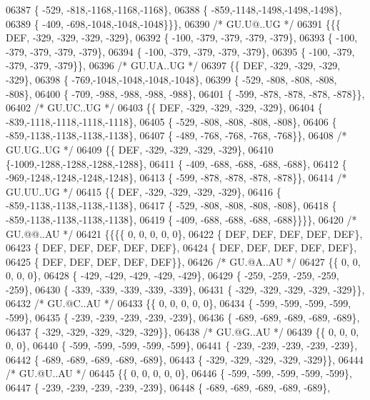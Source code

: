 \begin{DoxyCode}
06387 \{ -529, -818,-1168,-1168,-1168\},
06388 \{ -859,-1148,-1498,-1498,-1498\},
06389 \{ -409, -698,-1048,-1048,-1048\}\}\},
06390 \textcolor{comment}{/* GU.U@..UG */}
06391 \{\{\{  DEF, -329, -329, -329, -329\},
06392 \{ -100, -379, -379, -379, -379\},
06393 \{ -100, -379, -379, -379, -379\},
06394 \{ -100, -379, -379, -379, -379\},
06395 \{ -100, -379, -379, -379, -379\}\},
06396 \textcolor{comment}{/* GU.UA..UG */}
06397 \{\{  DEF, -329, -329, -329, -329\},
06398 \{ -769,-1048,-1048,-1048,-1048\},
06399 \{ -529, -808, -808, -808, -808\},
06400 \{ -709, -988, -988, -988, -988\},
06401 \{ -599, -878, -878, -878, -878\}\},
06402 \textcolor{comment}{/* GU.UC..UG */}
06403 \{\{  DEF, -329, -329, -329, -329\},
06404 \{ -839,-1118,-1118,-1118,-1118\},
06405 \{ -529, -808, -808, -808, -808\},
06406 \{ -859,-1138,-1138,-1138,-1138\},
06407 \{ -489, -768, -768, -768, -768\}\},
06408 \textcolor{comment}{/* GU.UG..UG */}
06409 \{\{  DEF, -329, -329, -329, -329\},
06410 \{-1009,-1288,-1288,-1288,-1288\},
06411 \{ -409, -688, -688, -688, -688\},
06412 \{ -969,-1248,-1248,-1248,-1248\},
06413 \{ -599, -878, -878, -878, -878\}\},
06414 \textcolor{comment}{/* GU.UU..UG */}
06415 \{\{  DEF, -329, -329, -329, -329\},
06416 \{ -859,-1138,-1138,-1138,-1138\},
06417 \{ -529, -808, -808, -808, -808\},
06418 \{ -859,-1138,-1138,-1138,-1138\},
06419 \{ -409, -688, -688, -688, -688\}\}\}\},
06420 \textcolor{comment}{/* GU.@@..AU */}
06421 \{\{\{\{    0,    0,    0,    0,    0\},
06422 \{  DEF,  DEF,  DEF,  DEF,  DEF\},
06423 \{  DEF,  DEF,  DEF,  DEF,  DEF\},
06424 \{  DEF,  DEF,  DEF,  DEF,  DEF\},
06425 \{  DEF,  DEF,  DEF,  DEF,  DEF\}\},
06426 \textcolor{comment}{/* GU.@A..AU */}
06427 \{\{    0,    0,    0,    0,    0\},
06428 \{ -429, -429, -429, -429, -429\},
06429 \{ -259, -259, -259, -259, -259\},
06430 \{ -339, -339, -339, -339, -339\},
06431 \{ -329, -329, -329, -329, -329\}\},
06432 \textcolor{comment}{/* GU.@C..AU */}
06433 \{\{    0,    0,    0,    0,    0\},
06434 \{ -599, -599, -599, -599, -599\},
06435 \{ -239, -239, -239, -239, -239\},
06436 \{ -689, -689, -689, -689, -689\},
06437 \{ -329, -329, -329, -329, -329\}\},
06438 \textcolor{comment}{/* GU.@G..AU */}
06439 \{\{    0,    0,    0,    0,    0\},
06440 \{ -599, -599, -599, -599, -599\},
06441 \{ -239, -239, -239, -239, -239\},
06442 \{ -689, -689, -689, -689, -689\},
06443 \{ -329, -329, -329, -329, -329\}\},
06444 \textcolor{comment}{/* GU.@U..AU */}
06445 \{\{    0,    0,    0,    0,    0\},
06446 \{ -599, -599, -599, -599, -599\},
06447 \{ -239, -239, -239, -239, -239\},
06448 \{ -689, -689, -689, -689, -689\},

\end{DoxyCode}
